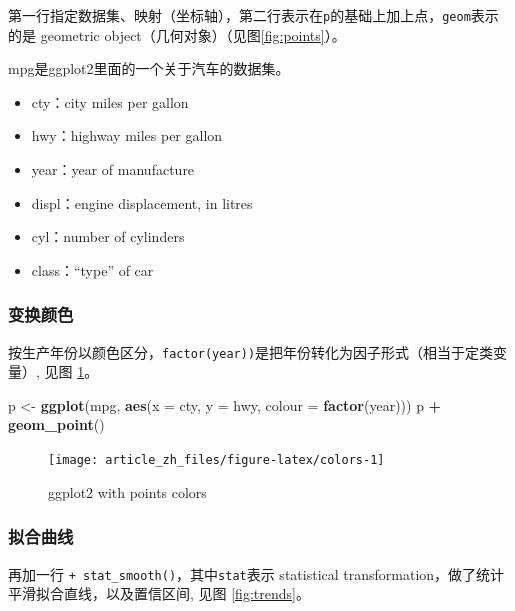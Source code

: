 \documentclass[]{article}
\newenvironment{Shaded}{\begin{snugshade}}{\end{snugshade}}
\newcommand{\DataTypeTok}[1]{\textcolor[rgb]{0.13,0.29,0.53}{#1}}
\newcommand{\KeywordTok}[1]{\textcolor[rgb]{0.13,0.29,0.53}{\textbf{#1}}}
\newcommand{\NormalTok}[1]{#1}
\newcommand{\OperatorTok}[1]{\textcolor[rgb]{0.81,0.36,0.00}{\textbf{#1}}}
\newcommand{\StringTok}[1]{\textcolor[rgb]{0.31,0.60,0.02}{#1}}
\providecommand{\tightlist}{%
  \setlength{\itemsep}{0pt}\setlength{\parskip}{0pt}}
\begin{document}
第一行指定数据集、映射（坐标轴），第二行表示在\texttt{p}的基础上加上点，\texttt{geom}表示的是
geometric object（几何对象）（见图\ref{fig:points}）。

mpg是ggplot2里面的一个关于汽车的数据集。

\begin{itemize}
\tightlist
\item
  cty：city miles per gallon
\item
  hwy：highway miles per gallon
\item
  year：year of manufacture
\item
  displ：engine displacement, in litres
\item
  cyl：number of cylinders
\item
  class：``type'' of car
\end{itemize}

\subsubsection{变换颜色}

按生产年份以颜色区分，\texttt{factor(year))}是把年份转化为因子形式（相当于定类变量）,
见图 \ref{fig:colors}。

\begin{Shaded}
\begin{Highlighting}[]
\NormalTok{p <-}\StringTok{ }\KeywordTok{ggplot}\NormalTok{(mpg, }\KeywordTok{aes}\NormalTok{(}\DataTypeTok{x =}\NormalTok{ cty, }\DataTypeTok{y =}\NormalTok{ hwy, }\DataTypeTok{colour =} \KeywordTok{factor}\NormalTok{(year)))}
\NormalTok{p }\OperatorTok{+}\StringTok{ }\KeywordTok{geom_point}\NormalTok{()}
\end{Highlighting}
\end{Shaded}

\begin{figure}

{\centering \texttt{[image: article\_zh\_files/figure-latex/colors-1]} 

}

\caption{ggplot2 with points colors}\label{fig:colors}
\end{figure}

\subsubsection{拟合曲线}

再加一行 \texttt{+\ stat\_smooth()}，其中\texttt{stat}表示 statistical
transformation，做了统计平滑拟合直线，以及置信区间, 见图
\ref{fig:trends}。
\end{document}

